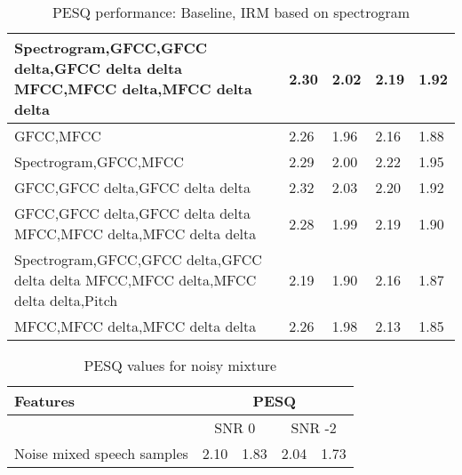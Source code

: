 \begin{enumerate}
\begin{itemize}
\begin{table}[!htbp]
\begin{tabular}{ |p{8cm}|p{1.7cm}|p{1.7cm}|p{1.7cm}|p{1.7cm}|  }
\hline
Spectrogram,GFCC,GFCC delta,GFCC delta delta MFCC,MFCC delta,MFCC delta delta	& 2.30	& 2.02	& 2.19	& 1.92\\
\hline
GFCC,MFCC	& 2.26	& 1.96	& 2.16	& 1.88\\
\hline
Spectrogram,GFCC,MFCC	& 2.29	& 2.00	& 2.22	& 1.95\\
\hline
\cellcolor[HTML]{ADD8E6}GFCC,GFCC delta,GFCC delta delta	& \cellcolor[HTML]{ADD8E6}2.32	& \cellcolor[HTML]{ADD8E6}2.03	& 2.20	& 1.92\\
\hline
GFCC,GFCC delta,GFCC delta delta MFCC,MFCC delta,MFCC delta delta	& 2.28	& 1.99	& 2.19	& 1.90\\
\hline
Spectrogram,GFCC,GFCC delta,GFCC delta delta MFCC,MFCC delta,MFCC delta delta,Pitch	& 2.19	& 1.90	& 2.16	& 1.87\\
\hline
MFCC,MFCC delta,MFCC delta delta	& 2.26	& 1.98	& 2.13	& 1.85\\
\hline
\end{tabular}
\caption{PESQ performance: Baseline, IRM based on spectrogram}
\label{tab:dnn_0_pesq}
\end{table}

\begin{table}[!htbp]
\centering
\begin{tabular}{ |p{8cm}|p{1.7cm}|p{1.7cm}|p{1.7cm}|p{1.7cm}|  }
\hline
\textbf{Features} & \multicolumn{4}{|c|}{\textbf{PESQ}}\\
\hline
\cellcolor{black} & \multicolumn{2}{|c|}{SNR 0} & \multicolumn{2}{|c|}{SNR -2}\\
\hline
Noise mixed speech samples & 2.10 & 1.83 & 2.04 & 1.73\\
\hline
\end{tabular}
\caption{PESQ values for noisy mixture}
\label{tab:pesq_mix}
\end{table}
 

\end{itemize}
\end{enumerate}
